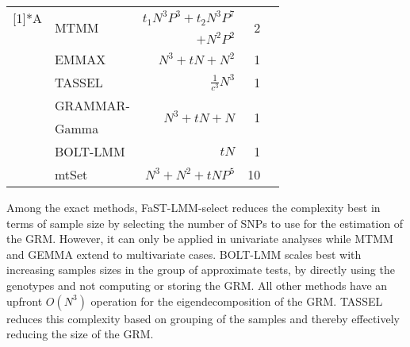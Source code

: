 \begin{table}[h]
\begin{small}
\begin{tabular}{llrrr}
    \addlinespace[3ex]
    \multirow{9}[1]{*}{A} & \multicolumn{1}{l}{\multirow{2}[0]{*}{MTMM}}  & \(t_1N^3P^3 + t_2N^3P^7 \) &  \multirow{2}[0]{*}{\num{2}} &  \multirow{2}[0]{*}{\citep{Korte2012}}\footnotemark[2] \\
                    \addlinespace[-.2ex]
          &  & \(+ N^2P^2\) & & \\
    		& EMMAX & \(N^3 + tN + N^2\) & \num{1} & \citep{Kang2010} \\
          & TASSEL & \(\frac{1}{c^3}N^3\) & \num{1} & \citep{Zhang2010} \\
          & GRAMMAR- & \multirow{2}[0]{*}{\(N^3 + tN + N\)} & \multirow{2}[0]{*}{\num{1}} & \multicolumn{1}{r}{\multirow{2}[0]{*}{\citep{Svishcheva2012}}} \\
          \addlinespace[-.5ex]
          & Gamma &       &       &  \\
          & BOLT-LMM & \(tN\) & \num{1} & \citep{Loh2014} \\
          & mtSet & \(N^3 + N^2 + tNP^5\) & \num{10} & \citep{Casale2015} \\
    \bottomrule
    \end{tabular}
  \end{small}
  \label{tab:lmmframeworks}%
\end{table}%
%
Among the exact methods, FaST-LMM-select reduces the complexity best in terms of sample size by selecting the number of SNPs to use for the estimation of the GRM.  However, it can only be applied in univariate analyses while MTMM and GEMMA extend to multivariate cases.  BOLT-LMM scales best with increasing samples sizes in the group of approximate tests, by directly using the genotypes and not computing or storing the GRM. All other methods have an upfront \(O(N^3)\) operation for the eigendecomposition of the GRM. TASSEL reduces this complexity based on grouping of the samples and thereby effectively reducing the size of the GRM.

